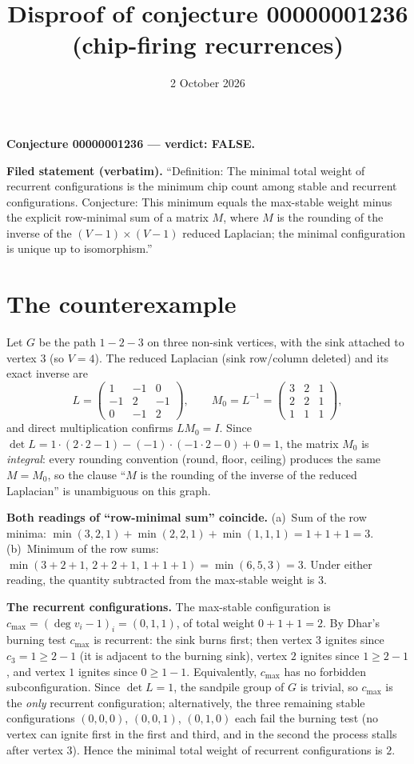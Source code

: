 \documentclass[11pt]{article}
\title{Disproof of conjecture 00000001236 (chip-firing recurrences)}
\date{2 October 2026}
\begin{document}
\maketitle
\textbf{Conjecture 00000001236 --- verdict: FALSE.}

\textbf{Filed statement (verbatim).} ``Definition: The minimal total weight of
recurrent configurations is the minimum chip count among stable and recurrent
configurations. Conjecture: This minimum equals the max-stable weight minus
the explicit row-minimal sum of a matrix $M$, where $M$ is the rounding of the
inverse of the $(V-1)\times(V-1)$ reduced Laplacian; the minimal configuration
is unique up to isomorphism.''

\section*{The counterexample}
Let $G$ be the path $1-2-3$ on three non-sink vertices, with the sink attached
to vertex $3$ (so $V=4$). The reduced Laplacian (sink row/column deleted) and
its exact inverse are
\[
L=\begin{pmatrix}1&-1&0\\-1&2&-1\\0&-1&2\end{pmatrix},
\qquad
M_0=L^{-1}=\begin{pmatrix}3&2&1\\2&2&1\\1&1&1\end{pmatrix},
\]
and direct multiplication confirms $LM_0=I$. Since
$\det L = 1\cdot(2\cdot2-1) - (-1)\cdot(-1\cdot 2-0) + 0 = 1$, the matrix
$M_0$ is \emph{integral}: every rounding convention (round, floor, ceiling)
produces the same $M=M_0$, so the clause ``$M$ is the rounding of the inverse
of the reduced Laplacian'' is unambiguous on this graph.

\textbf{Both readings of ``row-minimal sum'' coincide.}
(a)~Sum of the row minima:
$\min(3,2,1)+\min(2,2,1)+\min(1,1,1)=1+1+1=3$.
(b)~Minimum of the row sums: $\min(3{+}2{+}1,\,2{+}2{+}1,\,1{+}1{+}1)=\min(6,5,3)=3$.
Under either reading, the quantity subtracted from the max-stable weight
is $3$.

\textbf{The recurrent configurations.} The max-stable configuration is
$c_{\max}=(\deg v_i-1)_i=(0,1,1)$, of total weight $0+1+1=2$. By Dhar's
burning test $c_{\max}$ is recurrent: the sink burns first; then vertex $3$
ignites since $c_3=1\ge 2-1$ (it is adjacent to the burning sink), vertex $2$
ignites since $1\ge 2-1$, and vertex $1$ ignites since $0\ge 1-1$.
Equivalently, $c_{\max}$ has no forbidden subconfiguration. Since
$\det L=1$, the sandpile group of $G$ is trivial, so $c_{\max}$ is the
\emph{only} recurrent configuration; alternatively, the three remaining
stable configurations $(0,0,0)$, $(0,0,1)$, $(0,1,0)$ each fail the burning
test (no vertex can ignite first in the first and third, and in the second the
process stalls after vertex $3$). Hence the minimal total weight of recurrent
configurations is $2$.
\end{document}
